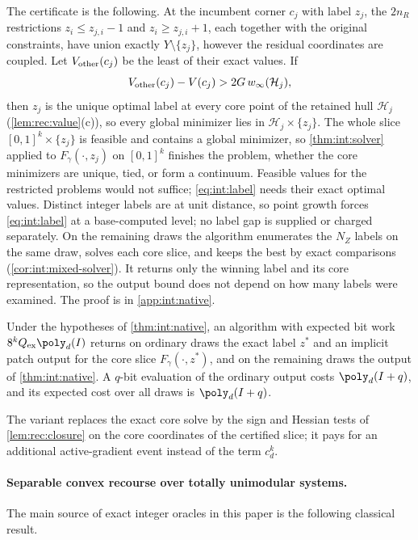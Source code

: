 The certificate is the following. At the incumbent corner $c_j$ with label
$z_j$, the $2n_R$ restrictions $z_i\le z_{j,i}-1$ and $z_i\ge z_{j,i}+1$,
each together with the original constraints, have union exactly
$Y\setminus\{z_j\}$, however the residual coordinates are coupled. Let
$V_{\rm other}(c_j)$ be the least of their exact values. If
\begin{equation}\label{eq:int:label}
 V_{\rm other}(c_j)-V(c_j)>2G\,w_\infty(\mathcal H_j),
\end{equation}
then $z_j$ is the unique optimal label at every core point of the retained
hull $\mathcal H_j$ (\cref{lem:rec:value}(c)), so every global minimizer lies
in $\mathcal H_j\times\{z_j\}$. The whole slice $[0,1]^k\times\{z_j\}$ is
feasible and contains a global minimizer, so \cref{thm:int:solver} applied to
$F_\gamma(\cdot,z_j)$ on $[0,1]^k$ finishes the problem, whether the core
minimizers are unique, tied, or form a continuum. Feasible values for the
restricted problems would not suffice; \eqref{eq:int:label} needs their exact
optimal values. Distinct integer labels are at unit distance, so point growth
forces \eqref{eq:int:label} at a base-computed level; no label gap is supplied
or charged separately. On the remaining draws the algorithm enumerates the
$N_Z$ labels on the same draw, solves each core slice, and keeps the best by
exact comparisons (\cref{cor:int:mixed-solver}). It returns only the winning
label and its core representation, so the output bound does not depend on
how many labels were examined. The proof is in \cref{app:int:native}.

\begin{corollary}\label{cor:int:native-implicit}
Under the hypotheses of \cref{thm:int:native}, an algorithm with expected bit
work $8^kQ_{\rm ex}\poly_d(I)$ returns on ordinary draws the exact label $z^*$
and an implicit patch output for the core slice $F_\gamma(\cdot,z^*)$, and on
the remaining draws the output of \cref{thm:int:native}. A $q$-bit evaluation
of the ordinary output costs $\poly_d(I+q)$, and its expected cost over all
draws is $\poly_d(I+q)$.
\end{corollary}

The variant replaces the exact core solve by the sign and Hessian tests of
\cref{lem:rec:closure} on the core coordinates of the certified slice; it pays
for an additional active-gradient event instead of the term $c_d^k$.

\paragraph{Separable convex recourse over totally unimodular systems.}
The main source of exact integer oracles in this paper is the following
classical result.


